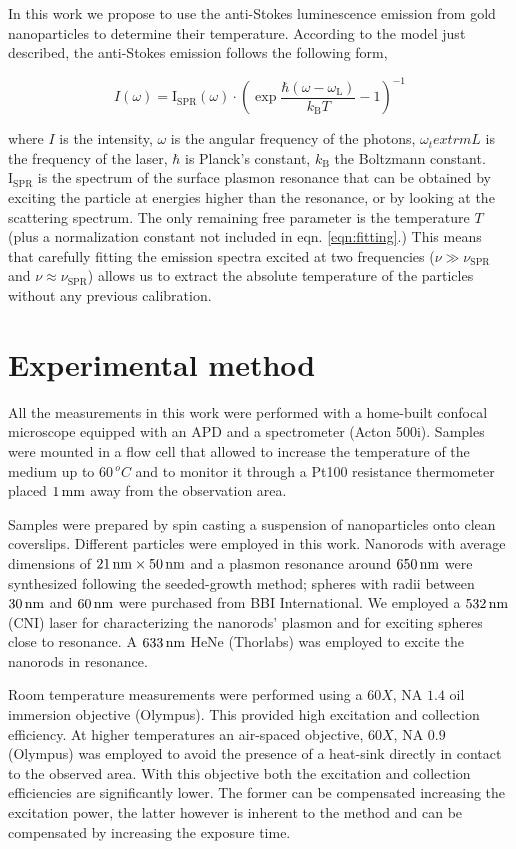 In this work we propose to use the anti-Stokes luminescence emission from gold
nanoparticles to determine their temperature. According to the model just
described, the anti-Stokes emission follows the following form,

\begin{equation}\label{eqn:fitting}
	I(\omega) =
	\textrm{I}_{\textrm{SPR}}(\omega)\cdot\left(\exp\frac{\hbar(\omega-\omega_\textrm{L})}{k_\textrm{B}T}-1\right)^{-1}
\end{equation}

where $I$ is the intensity, $\omega$ is the angular frequency of the photons,
$\omega_textrm{L}$ is the frequency of the laser, $\hbar$ is Planck's constant,
$k_\textrm{B}$ the Boltzmann constant. $\textrm{I}_{\textrm{SPR}}$ is the
spectrum of the surface plasmon resonance that can be obtained by exciting the
particle at energies higher than the resonance, or by looking at the scattering
spectrum. The only remaining free parameter is the temperature $T$ (plus a
normalization constant not included in eqn. \ref{eqn:fitting}.) This means that
carefully fitting the emission spectra excited at two frequencies
($\nu\gg\nu_{\textrm{SPR}}$ and $\nu\approx\nu_{\textrm{SPR}}$) allows us to
extract the absolute temperature of the particles without any previous
calibration.


\section{Experimental method}
All the measurements in this work were performed with a home-built confocal
microscope equipped with an APD and a spectrometer (Acton 500i). Samples were
mounted in a flow cell that allowed to increase the temperature of the medium up
to $60\,^oC$ and to monitor it through a Pt100 resistance thermometer placed
$1\,\textrm{mm}$ away from the observation area.

Samples were prepared by spin casting a suspension of nanoparticles onto clean
coverslips. Different particles were employed in this work. Nanorods with
average dimensions of $21\,\textrm{nm}\times50\,\textrm{nm}$ and a plasmon resonance around $650\,\textrm{nm}$
were synthesized following the seeded-growth method\cite{Nikoobakht2003};
spheres with radii between $30\,\textrm{nm}$ and $60\,\textrm{nm}$ were purchased from BBI
International. We employed a $532\,\textrm{nm}$ (CNI) laser for characterizing the
nanorods' plasmon and for exciting spheres close to resonance. A $633\,\textrm{nm}$ HeNe
(Thorlabs) was employed to excite the nanorods in resonance.

Room temperature measurements were performed using a $60X$, NA $1.4$ oil
immersion objective (Olympus). This provided high excitation and collection
efficiency. At higher temperatures an air-spaced objective, $60X$, NA $0.9$
(Olympus) was employed to avoid the presence of a heat-sink directly in contact
to the observed area. With this objective both the excitation
and collection efficiencies are significantly lower. The former can be
compensated increasing the excitation power, the latter however is inherent to the method
and can be compensated by increasing the exposure time.

